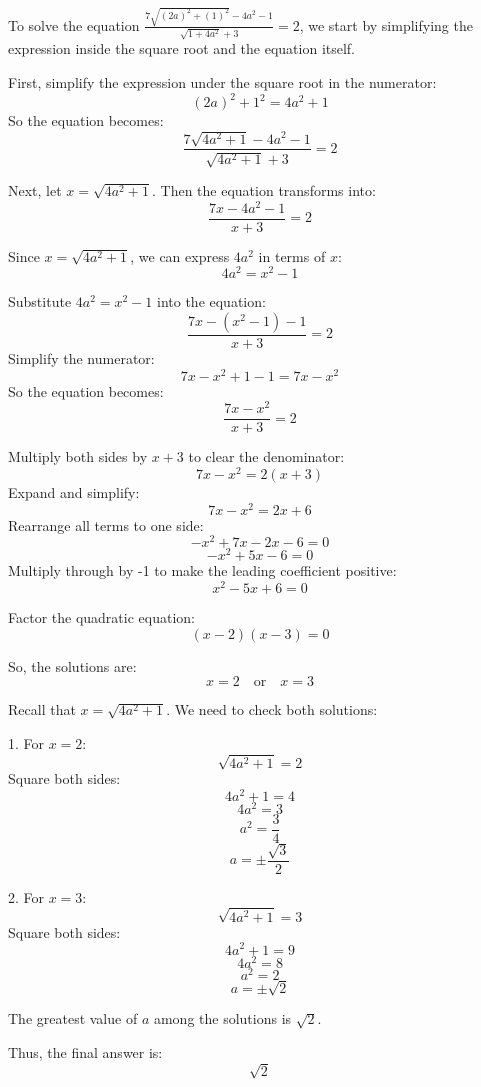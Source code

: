 \begin{figure*}[htbp]
    \centering
\begin{tcolorbox}[title=Small Teacher CoT Example (1/2), promptstyle]
\lstset{
    basicstyle=\normalfont\sffamily\footnotesize,
    breaklines=true,
    frame=none,
    columns=fullflexible,
}

To solve the equation \(\frac{7\sqrt{(2a)^2+(1)^2}-4a^2-1}{\sqrt{1+4a^2}+3}=2\), we start by simplifying the expression inside the square root and the equation itself.

First, simplify the expression under the square root in the numerator:
\[
(2a)^2 + 1^2 = 4a^2 + 1
\]
So the equation becomes:
\[
\frac{7\sqrt{4a^2 + 1} - 4a^2 - 1}{\sqrt{4a^2 + 1} + 3} = 2
\]

Next, let \( x = \sqrt{4a^2 + 1} \). Then the equation transforms into:
\[
\frac{7x - 4a^2 - 1}{x + 3} = 2
\]

Since \( x = \sqrt{4a^2 + 1} \), we can express \( 4a^2 \) in terms of \( x \):
\[
4a^2 = x^2 - 1
\]

Substitute \( 4a^2 = x^2 - 1 \) into the equation:
\[
\frac{7x - (x^2 - 1) - 1}{x + 3} = 2
\]
Simplify the numerator:
\[
7x - x^2 + 1 - 1 = 7x - x^2
\]
So the equation becomes:
\[
\frac{7x - x^2}{x + 3} = 2
\]

Multiply both sides by \( x + 3 \) to clear the denominator:
\[
7x - x^2 = 2(x + 3)
\]
Expand and simplify:
\[
7x - x^2 = 2x + 6
\]
Rearrange all terms to one side:
\[
-x^2 + 7x - 2x - 6 = 0
\]
\[
-x^2 + 5x - 6 = 0
\]
Multiply through by -1 to make the leading coefficient positive:
\[
x^2 - 5x + 6 = 0
\]

\end{tcolorbox}
    
\end{figure*}




\begin{figure*}[htbp]
    \centering
\begin{tcolorbox}[title=Small Teacher CoT Example (2/2), promptstyle]
\lstset{
    basicstyle=\normalfont\sffamily\footnotesize,
    breaklines=true,
    frame=none,
    columns=fullflexible,
}

Factor the quadratic equation:
\[
(x - 2)(x - 3) = 0
\]

So, the solutions are:
\[
x = 2 \quad \text{or} \quad x = 3
\]

Recall that \( x = \sqrt{4a^2 + 1} \). We need to check both solutions:

1. For \( x = 2 \):
\[
\sqrt{4a^2 + 1} = 2
\]
Square both sides:
\[
4a^2 + 1 = 4
\]
\[
4a^2 = 3
\]
\[
a^2 = \frac{3}{4}
\]
\[
a = \pm \frac{\sqrt{3}}{2}
\]

2. For \( x = 3 \):
\[
\sqrt{4a^2 + 1} = 3
\]
Square both sides:
\[
4a^2 + 1 = 9
\]
\[
4a^2 = 8
\]
\[
a^2 = 2
\]
\[
a = \pm \sqrt{2}
\]

The greatest value of \( a \) among the solutions is \( \sqrt{2} \).

Thus, the final answer is:
\[
\boxed{\sqrt{2}}
\]
\end{tcolorbox}
    
\end{figure*}




